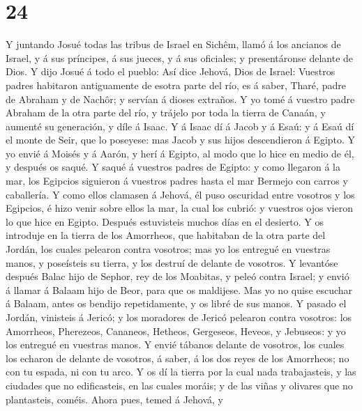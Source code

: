 \hypertarget{section-23}{%
\section{24}\label{section-23}}

 Y juntando Josué todas las tribus de Israel en Sichêm,
llamó á los ancianos de Israel, y á sus príncipes, á sus jueces, y á sus
oficiales; y presentáronse delante de Dios.  Y dijo Josué
á todo el pueblo: Así dice Jehová, Dios de Israel: Vuestros padres
habitaron antiguamente de esotra parte del río, es á saber, Tharé, padre
de Abraham y de Nachôr; y servían á dioses extraños.  Y yo
tomé á vuestro padre Abraham de la otra parte del río, y trájelo por
toda la tierra de Canaán, y aumenté su generación, y díle á Isaac.
 Y á Isaac dí á Jacob y á Esaú: y á Esaú dí el monte de
Seir, que lo poseyese: mas Jacob y sus hijos descendieron á Egipto.
 Y yo envié á Moisés y á Aarón, y herí á Egipto, al modo
que lo hice en medio de él, y después os saqué.  Y saqué á
vuestros padres de Egipto: y como llegaron á la mar, los Egipcios
siguieron á vuestros padres hasta el mar Bermejo con carros y
caballería.  Y como ellos clamasen á Jehová, él puso
oscuridad entre vosotros y los Egipcios, é hizo venir sobre ellos la
mar, la cual los cubrió: y vuestros ojos vieron lo que hice en Egipto.
Después estuvisteis muchos días en el desierto.  Y os
introduje en la tierra de los Amorrheos, que habitaban de la otra parte
del Jordán, los cuales pelearon contra vosotros; mas yo los entregué en
vuestras manos, y poseísteis su tierra, y los destruí de delante de
vosotros.  Y levantóse después Balac hijo de Sephor, rey
de los Moabitas, y peleó contra Israel; y envió á llamar á Balaam hijo
de Beor, para que os maldijese.  Mas yo no quise escuchar
á Balaam, antes os bendijo repetidamente, y os libré de sus manos.
 Y pasado el Jordán, vinisteis á Jericó; y los moradores
de Jericó pelearon contra vosotros: los Amorrheos, Pherezeos, Cananeos,
Hetheos, Gergeseos, Heveos, y Jebuseos: y yo los entregué en vuestras
manos.  Y envié tábanos delante de vosotros, los cuales
los echaron de delante de vosotros, á saber, á los dos reyes de los
Amorrheos; no con tu espada, ni con tu arco.  Y os dí la
tierra por la cual nada trabajasteis, y las ciudades que no
edificasteis, en las cuales moráis; y de las viñas y olivares que no
plantasteis, coméis.  Ahora pues, temed á Jehová, y
